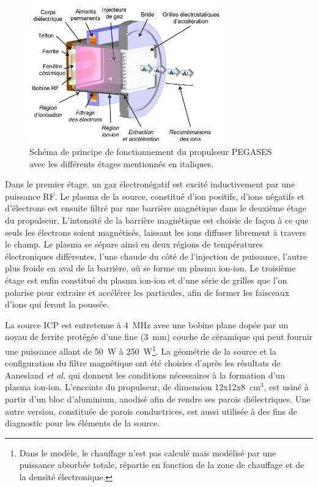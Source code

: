 \begin{refsection}
\begin{figure}[!htbp]
\centering
\includegraphics[width=0.75\textwidth]{figures/4-pegases3D.png}
{\caption{Schéma de principe de fonctionnement du propulseur PEGASES avec les
différents étages mentionnés en italiques\parencite{Popelier}.}
\label{4-pegases3D}}
\end{figure}

Dans le premier étage, un gaz électronégatif est
excité inductivement par une puissance RF.
Le plasma de la source, constitué d'ion positifs, d'ions négatifs et d'électrons
est ensuite filtré par une barrière magnétique dans le deuxième étage du
propulseur. L'intensité de la barrière magnétique est choisie de façon à ce que
seuls les électrons soient magnétisés, laissant les ions diffuser librement à
travers le champ. Le plasma se sépare ainsi en deux régions de températures
électroniques différentes, l'une chaude du côté de l'injection de puissance,
l'autre plus froide en aval de la barrière, où se forme un plasma
ion-ion. Le troisième étage est enfin constitué du plasma ion-ion et
d'une série de grilles que l'on polarise pour extraire et accélérer les
particules, afin de former les faisceaux d'ions qui feront la poussée. 

La source ICP est entretenue à 4~MHz avec une bobine plane dopée par un noyau de
ferrite protégée d'une fine (3~mm) couche de céramique\parencite{Godyak} qui
peut fournir une puissance allant de 50~W à 250~W\footnote{Dans le modèle, 
le chauffage n'est pas calculé mais modélisé par une puissance
absorbée totale, répartie en fonction de la zone de chauffage et de la densité
électronique.}. La géométrie de la source et la configuration du filtre magnétique ont été choisies d'après les résultats de Aanesland \emph{et al.}\parencite{Aanesland} qui donnent les conditions nécessaires à la
formation d'un plasma ion-ion. L'enceinte du propulseur, de dimension
12x12x8~cm$^3$, est usiné à partir d'un bloc d'aluminium, anodisé afin de rendre
ses parois diélectriques. Une autre version, constituée de parois conductrices,
est aussi utilisée à des fins de diagnostic pour les éléments de la source.


\end{refsection}
